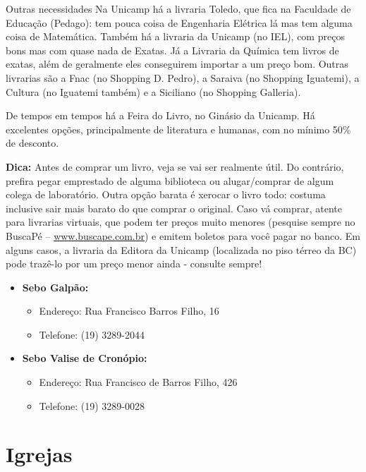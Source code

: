 \begin{story}{Outras necessidades}
Na Unicamp há a livraria Toledo, que fica na Faculdade de Educação (Pedago): tem pouca coisa de Engenharia Elétrica lá mas tem alguma coisa de Matemática. Também há a livraria da Unicamp (no IEL), com preços bons mas com quase nada de Exatas. Já a Livraria da Química tem livros de exatas, além de geralmente eles conseguirem importar a um preço bom. Outras livrarias são a Fnac (no Shopping D. Pedro), a Saraiva (no Shopping Iguatemi), a Cultura (no Iguatemi também) e a Siciliano (no Shopping Galleria).

De tempos em tempos há a Feira do Livro, no Ginásio da Unicamp. Há excelentes opções, principalmente de literatura e humanas, com no mínimo 50\% de desconto.

\textbf{Dica:} Antes de comprar um livro, veja se vai ser realmente útil. Do contrário, prefira pegar emprestado de alguma biblioteca ou alugar/comprar de algum colega de laboratório. Outra opção barata é xerocar o livro todo: costuma inclusive sair mais barato do que comprar o original. Caso vá comprar, atente para livrarias virtuais, que podem ter preços muito menores (pesquise sempre no BuscaPé -- \url{www.buscape.com.br}) e emitem boletos para você pagar no banco. Em alguns casos, a livraria da Editora da Unicamp (localizada no piso térreo da BC) pode trazê-lo por um preço menor ainda - consulte sempre!

\begin{itemize}
\item \textbf{Sebo Galpão:}
\begin{itemize}
\item Endereço: Rua Francisco Barros Filho, 16
\item Telefone: (19) 3289-2044
\end{itemize}

\item \textbf{Sebo Valise de Cronópio:}
\begin{itemize}
\item Endereço: Rua Francisco de Barros Filho, 426
\item Telefone: (19) 3289-0028
\end{itemize}

\end{itemize}

\section*{Igrejas}

\begin{itemize}


\end{itemize}
\end{story}
